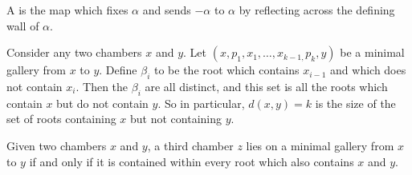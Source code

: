 \documentclass[11pt]{article}
\begin{document}


\begin{definition}\label{fold}
    A  is the map which fixes $\alpha$ and sends $-\alpha$ to $\alpha$ by reflecting across the defining wall of $\alpha$. 
\end{definition}

\begin{proposition}
    Consider any two chambers $x$ and $y$. Let $(x,p_1,x_1,\hdots ,x_{k-1,}p_k,y)$ be a minimal gallery from $x$ to $y$. Define $\beta_i$ to be the root which contains $x_{i-1}$ and which does not contain $x_i$. Then the $\beta_i$ are all distinct, and this set is all the roots which contain $x$ but do not contain $y$. So in particular, $d(x,y)=k$ is the size of the set of roots containing $x$ but not containing $y$. 
\end{proposition}

\begin{proposition}
    Given two chambers $x$ and $y$, a third chamber $z$ lies on a minimal gallery from $x$ to $y$ if and only if it is contained within every root which also contains $x$ and $y$. 
\end{proposition}




\end{document}

